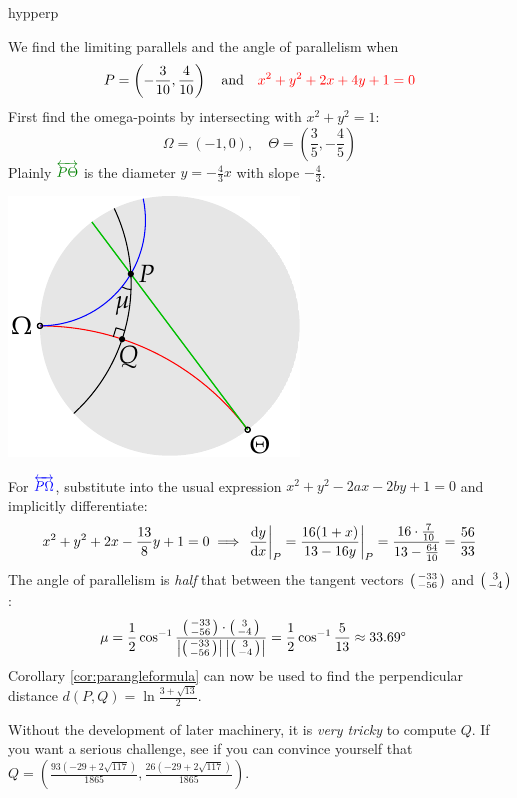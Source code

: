 \begin{examples}{}{hypperp}
\begin{enumerate}
		\begin{minipage}[t]{0.68\linewidth}\vspace{0pt}
		  \item We find the limiting parallels and the angle of parallelism when
			\[
				P=\left(-\frac 3{10},\frac 4{10}\right)\quad\text{and}\quad \textcolor{red}{x^2+y^2+2x+4y+1=0}
			\]
			First find the omega-points by intersecting with $x^2+y^2=1$:
			\[
				\Omega=(-1,0),\quad \Theta=\left(\frac 35,-\frac 45\right)
			\]
			Plainly $\textcolor{Green}{\overleftrightarrow{P\Theta}}$ is the diameter $y=-\frac 43x$ with slope $-\frac 43$.
		\end{minipage}
		\hfill
		\begin{minipage}[t]{0.31\linewidth}\vspace{0pt}
			\flushright\includegraphics[scale=0.95]{basic-parallels3}
		\end{minipage}\smallbreak
		For $\textcolor{blue}{\overleftrightarrow{P\Omega}}$, substitute into the usual expression $x^2+y^2-2ax-2by+1=0$ and implicitly differentiate:
		\[
			x^2+y^2+2x-\frac{13}8y+1=0\implies \diffat[y]{x}{P}=\frac{16(1+x)}{13-16y}\bigg|_P=\frac{16\cdot\frac 7{10}}{13-\frac{64}{10}}=\frac{56}{33}
		\]
		The angle of parallelism is \emph{half} that between the tangent vectors $\stwovec{-33}{-56}$ and $\stwovec 3{-4}$:
		\begin{align*}
			\mu&=\frac 12\cos^{-1}\frac{\stwovec{-33}{-56}\cdot\stwovec{3}{-4}}{\nm{\stwovec{-33}{-56}}\nm{\stwovec{3}{-4}}}
			=\frac 12\cos^{-1}\frac 5{13}\approx \ang{33.69}
		\end{align*}
		Corollary \ref{cor:parangleformula} can now be used to find the perpendicular distance $d(P,Q)=\ln\frac{3+\sqrt{13}}2$.\par
		Without the development of later machinery, it is \emph{very tricky} to compute $Q$. If you want a serious challenge, see if you can convince yourself that $Q=\left(\frac{93(-29+2\sqrt{117})}{1865}, \frac{26(-29+2\sqrt{117})}{1865}\right)$.
	\end{enumerate}
\end{examples}


